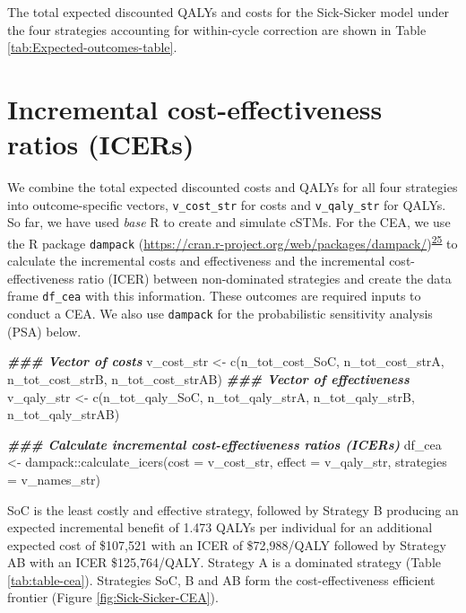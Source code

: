 \documentclass[
]{article}
\newenvironment{Shaded}{\begin{snugshade}}{\end{snugshade}}
\newcommand{\AttributeTok}[1]{\textcolor[rgb]{0.77,0.63,0.00}{#1}}
\newcommand{\DocumentationTok}[1]{\textcolor[rgb]{0.56,0.35,0.01}{\textbf{\textit{#1}}}}
\newcommand{\FunctionTok}[1]{\textcolor[rgb]{0.00,0.00,0.00}{#1}}
\newcommand{\NormalTok}[1]{#1}
\newcommand{\OtherTok}[1]{\textcolor[rgb]{0.56,0.35,0.01}{#1}}
\newcommand{\SpecialCharTok}[1]{\textcolor[rgb]{0.00,0.00,0.00}{#1}}
\begin{document}
The total expected discounted QALYs and costs for the Sick-Sicker model under the four strategies accounting for within-cycle correction are shown in Table \ref{tab:Expected-outcomes-table}.

\hypertarget{incremental-cost-effectiveness-ratios-icers}{%
\section{Incremental cost-effectiveness ratios (ICERs)}\label{incremental-cost-effectiveness-ratios-icers}}

We combine the total expected discounted costs and QALYs for all four strategies into outcome-specific vectors, \texttt{v\_cost\_str} for costs and \texttt{v\_qaly\_str} for QALYs. So far, we have used \emph{base} R to create and simulate cSTMs. For the CEA, we use the R package \texttt{dampack} (\url{https://cran.r-project.org/web/packages/dampack/})\textsuperscript{\protect\hyperlink{ref-Alarid-Escudero2021}{25}} to calculate the incremental costs and effectiveness and the incremental cost-effectiveness ratio (ICER) between non-dominated strategies and create the data frame \texttt{df\_cea} with this information. These outcomes are required inputs to conduct a CEA. We also use \texttt{dampack} for the probabilistic sensitivity analysis (PSA) below.

\begin{Shaded}
\begin{Highlighting}[]
\DocumentationTok{\#\#\# Vector of costs}
\NormalTok{v\_cost\_str }\OtherTok{\textless{}{-}} \FunctionTok{c}\NormalTok{(n\_tot\_cost\_SoC, n\_tot\_cost\_strA, n\_tot\_cost\_strB, n\_tot\_cost\_strAB)}
\DocumentationTok{\#\#\# Vector of effectiveness}
\NormalTok{v\_qaly\_str }\OtherTok{\textless{}{-}} \FunctionTok{c}\NormalTok{(n\_tot\_qaly\_SoC, n\_tot\_qaly\_strA, n\_tot\_qaly\_strB, n\_tot\_qaly\_strAB)}

\DocumentationTok{\#\#\# Calculate incremental cost{-}effectiveness ratios (ICERs)}
\NormalTok{df\_cea }\OtherTok{\textless{}{-}}\NormalTok{ dampack}\SpecialCharTok{::}\FunctionTok{calculate\_icers}\NormalTok{(}\AttributeTok{cost =}\NormalTok{ v\_cost\_str, }
                                   \AttributeTok{effect =}\NormalTok{ v\_qaly\_str,}
                                   \AttributeTok{strategies =}\NormalTok{ v\_names\_str)}
\end{Highlighting}
\end{Shaded}

SoC is the least costly and effective strategy, followed by Strategy B producing an expected incremental benefit of 1.473 QALYs per individual for an additional expected cost of \$107,521 with an ICER of \$72,988/QALY followed by Strategy AB with an ICER \$125,764/QALY. Strategy A is a dominated strategy (Table \ref{tab:table-cea}). Strategies SoC, B and AB form the cost-effectiveness efficient frontier (Figure \ref{fig:Sick-Sicker-CEA}).
\end{document}
